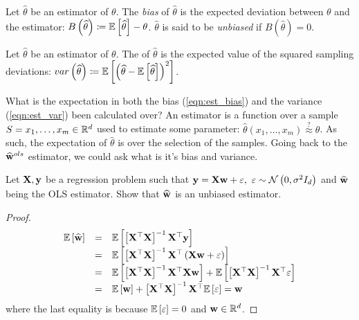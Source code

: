 \begin{definition}\label{eqn:est_bias}
Let $\widehat{\theta}$ be an estimator of $\theta$. The \textit{bias} of $\widehat{\theta}$ is the expected deviation between $\theta$ and the estimator: $B\left(\widehat{\theta}\right)\coloneqq\mathbb{E}\left[\widehat{\theta}\right]-\theta$. $\widehat{\theta}$ is said to be \textit{unbiased} if $B\left(\widehat{\theta}\right)=0$.
\end{definition}

\begin{definition}\label{eqn:est_var}
Let $\widehat{\theta}$ be an estimator of $\theta$. The  of $\widehat{\theta}$ is the expected value of the squared sampling deviations: $var\left(\widehat{\theta}\right)\coloneqq\mathbb{E}\left[\left(\widehat{\theta}-\mathbb{E}\left[\widehat{\theta}\right]\right)^2\right]$.
\end{definition}

What is the expectation in both the bias (\ref{eqn:est_bias}) and the variance (\ref{eqn:est_var}) been calculated over? An estimator is a function over a sample $S=x_1,\ldots,x_m\in\mathbb{R}^d$ used to estimate some parameter: $\widehat{\theta}\left(x_1,\ldots,x_m\right)\overset{?}{\approx}\theta$. As such, the expectation of $\widehat{\theta}$ is over the selection of the samples. Going back to the $\widehat{\mathbf{w}}^{ols}$ estimator, we could ask what is it's bias and variance.

\begin{exercise}
Let $\mathbf{X},\mathbf{y}$ be a regression problem such that $\mathbf{y}=\mathbf{X}\mathbf{w}+\varepsilon,\,\,\varepsilon\sim\mathcal{N}\left(0,\sigma^2I_d\right)$ and $\widehat{\mathbf{w}}$ being the OLS estimator. Show that $\widehat{\mathbf{w}}$ is an unbiased estimator.
\end{exercise}
\begin{proof}
$$
\begin{array}{ccl}
\mathbb{E}\left[\widehat{\mathbf{w}}\right] & = &\mathbb{E}\left[\left[\mathbf{X}^\top\mathbf{X}\right]^{-1}\mathbf{X}^\top\mathbf{y}\right] \\
& = & \mathbb{E}\left[\left[\mathbf{X}^\top\mathbf{X}\right]^{-1}\mathbf{X}^\top\left(\mathbf{X}\mathbf{w} +\varepsilon\right)\right] \\
& = & \mathbb{E}\left[\left[\mathbf{X}^\top\mathbf{X}\right]^{-1}\mathbf{X}^\top\mathbf{X}\mathbf{w}\right] + \mathbb{E}\left[\left[\mathbf{X}^\top\mathbf{X}\right]^{-1}\mathbf{X}^\top\varepsilon\right]\\
& = & \mathbb{E}\left[\mathbf{w}\right] + \left[\mathbf{X}^\top\mathbf{X}\right]^{-1}\mathbf{X}^\top\mathbb{E}\left[\varepsilon\right] = \mathbf{w}\\
\end{array}
$$
where the last equality is because $\mathbb{E}\left[\varepsilon\right]=0$ and $\mathbf{w}\in\mathbb{R}^d$.
\end{proof}
~\\

